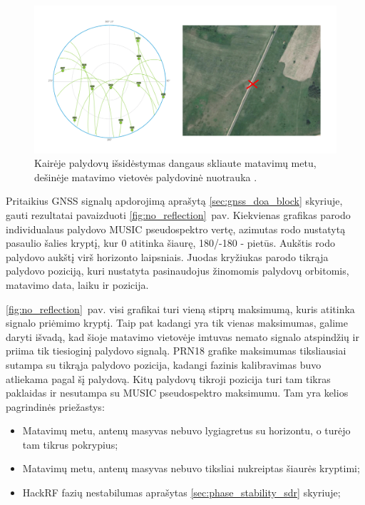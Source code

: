 \documentclass[main.tex]{subfiles}
\begin{document}
\begin{figure}[ht]
    \begin{centering}
    \includegraphics[scale=0.35]{drawings/open_sat_positions.drawio}
    \par\end{centering}
    \protect\caption{\label{fig:no_reflection_sat_pos}Kairėje palydovų išsidėstymas dangaus skliaute matavimų metu, dešinėje matavimo vietovės palydovinė nuotrauka \cite{google_maps}.}
\end{figure}

Pritaikius GNSS signalų apdorojimą aprašytą \ref{sec:gnss_doa_block} skyriuje, gauti
rezultatai pavaizduoti \ref{fig:no_reflection}~pav. Kiekvienas grafikas parodo
individualaus palydovo MUSIC pseudospektro vertę, azimutas rodo nustatytą
pasaulio šalies kryptį, kur 0 atitinka šiaurę, 180/-180 - pietūs. Aukštis rodo palydovo aukštį virš horizonto
laipsniais.
Juodas kryžiukas parodo tikrąja palydovo poziciją, kuri
nustatyta pasinaudojus žinomomis palydovų orbitomis, matavimo data, laiku ir pozicija.

\ref{fig:no_reflection}~pav. visi grafikai turi vieną stiprų maksimumą, kuris atitinka signalo priėmimo kryptį.
Taip pat kadangi yra tik vienas maksimumas, galime daryti išvadą, kad šioje matavimo vietovėje
imtuvas nemato signalo atspindžių ir priima tik tiesioginį palydovo signalą.
PRN18 grafike maksimumas tiksliausiai sutampa su tikrąja palydovo pozicija, kadangi
fazinis kalibravimas buvo atliekama pagal šį palydovą.
Kitų palydovų tikroji pozicija turi tam tikras paklaidas ir nesutampa su MUSIC pseudospektro
maksimumu. Tam yra kelios pagrindinės priežastys:

\begin{itemize}
    \item Matavimų metu, antenų masyvas nebuvo lygiagretus su horizontu, o turėjo tam tikrus pokrypius;
    \item Matavimų metu, antenų masyvas nebuvo tiksliai nukreiptas šiaurės kryptimi;
    \item HackRF fazių nestabilumas aprašytas \ref{sec:phase_stability_sdr} skyriuje;
\end{itemize}
\end{document}
